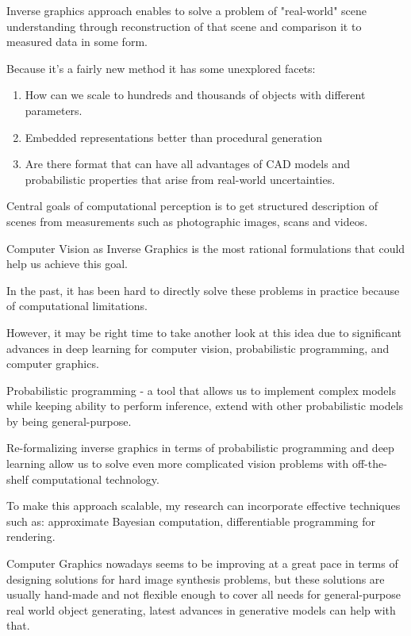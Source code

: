 Inverse graphics approach enables to solve a problem of "real-world" scene understanding through reconstruction of that scene and comparison it to measured data in some form.

Because it's a fairly new method it has some unexplored facets:
\begin{enumerate}
    \item How can we scale to hundreds and thousands of objects with different parameters.
    \item Embedded representations better than procedural generation
    \item Are there format that can have all advantages of CAD models and probabilistic properties that arise from real-world uncertainties.
\end{enumerate}

Central goals of computational perception is to get structured description of scenes from measurements such as photographic images, scans and videos.

Computer Vision as Inverse Graphics is the most rational formulations that could help us achieve this goal.

In the past, it has been hard to directly solve these problems in practice because of computational limitations.

However, it may be right time to take another look at this idea due to significant advances in deep learning for computer vision, probabilistic programming, and computer graphics.

Probabilistic programming - a tool that allows us to implement complex models while keeping ability to perform inference, extend with other probabilistic models by being general-purpose.

Re-formalizing inverse graphics in terms of probabilistic programming and deep learning allow us to solve even more complicated vision problems with off-the-shelf computational technology.

To make this approach scalable, my research can incorporate effective techniques such as: approximate Bayesian computation, differentiable programming for rendering.

Computer Graphics nowadays seems to be improving at a great pace in terms of designing solutions for hard image synthesis problems, but these solutions are usually hand-made and not flexible enough to cover all needs for general-purpose real world object generating, latest advances in generative models can help with that.



